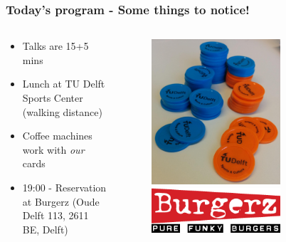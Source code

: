 \documentclass{beamer}
\begin{document}
\begin{frame}
 \frametitle{Today's program - Some things to notice!}
 \begin{columns}
 \begin{column}{0.6\textwidth}
 \begin{itemize}
  \item Talks are {\color{tudblue}15+5 mins}
  \item {\color{tudblue}Lunch} at TU Delft Sports Center (walking distance)
  \item {\color{tudblue}Coffee} machines work with \textit{our} cards
  \item 19:00 - Reservation at {\color{tudblue}Burgerz} (Oude Delft 113, 2611 BE, Delft)
 \end{itemize}

 \end{column}

 \begin{column}{0.4\textwidth}
  \begin{figure}[t]
  \includegraphics[width=0.7\textwidth]{pics/money.jpg}\\ \vspace{0.6cm}
  \includegraphics[width=0.7\textwidth]{pics/logo.png}
  \end{figure}
 \end{column}
 \end{columns}
\end{frame}
\end{document}
